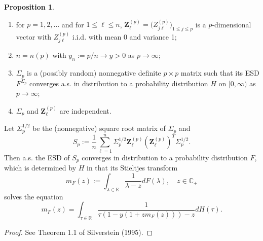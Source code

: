 \documentclass[a4paper,11pt]{article}
\theoremstyle{plain}
\theoremstyle{definition}
\newtheorem{prps}[thm]{Proposition}
\newcommand{\MR}{\mathbb{R}}
\begin{document}
	\begin{prps}\label{MP law} \
		\begin{enumerate}
			\item for $p = 1, 2, \dots$ and for $1 \leq \ell \leq n$, $\mathbf{Z}_{\ell}^{(p)} = \big(Z_{j\ell}^{(p)}\big)_{1 \leq j \leq p}$ is a $p$-dimensional vector with $Z_{j\ell}^{(p)}$ i.i.d. with mean 0 and variance 1;
			\item $n = n(p)$ with $y_n := p/n \rightarrow y > 0$ as $p \rightarrow \infty$;
			\item $\Sigma_p$ is a (possibly random) nonnegative definite $p \times p$ matrix such that its ESD $F^{\Sigma_p}$ converges a.s. in distribution to a probability distribution $H$ on $[0,\infty)$ as $p \rightarrow \infty$;
			\item $\Sigma_p$ and $\mathbf{Z}_\ell^{(p)}$ are independent.
		\end{enumerate}
		Let $\Sigma_p^{1/2}$ be the (nonnegative) square root matrix of $\Sigma_p$ and 
		\[S_p:= \frac{1}{n} \sum_{\ell=1}^{n} \Sigma_p^{1/2} \mathbf{Z}_\ell^{(p)}(\mathbf{Z}_\ell^{(p)})^T \Sigma_p^{1/2}.\]
		Then a.s. the ESD of $S_p$ converges in distribution to a probability distribution $F$, which is determined by $H$ in that its Stieltjes transform
		\[ m_F(z):=\int_{\lambda \in \MR} \frac{1}{\lambda - z} dF(\lambda) , \quad z \in \mathbb{C}_+ \]
		solves the equation
		\begin{equation} \label{MP eq}
		m_F(z) = \int_{\tau \in \MR} \frac{1}{\tau (1-y(1+zm_F(z))) - z } dH(\tau).
		\end{equation}
	\end{prps}
	\begin{proof}
		 See Theorem 1.1 of Silverstein (1995).
	\end{proof}
	
\end{document}
